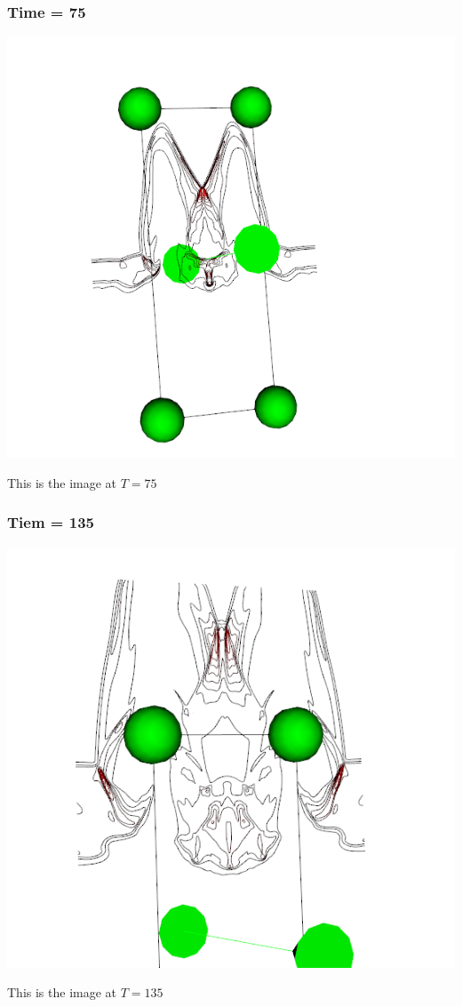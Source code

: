 \documentclass[11pt]{scrartcl}
\begin{document}
\subsubsection{Time = 75}
\begin{minipage}[t]{\linewidth}
{
\includegraphics[scale = 0.5]{img_4_75.png}

\centering
\medskip
{\footnotesize This is the image at $T = 75$}
}
\end{minipage}
\subsubsection{Tiem = 135}
\begin{minipage}[t]{\linewidth}
{
\includegraphics[scale = 0.5]{img_4_135.png}

\centering
\medskip
{\footnotesize This is the image at $T = 135$}
}
\end{minipage}
\end{document}
